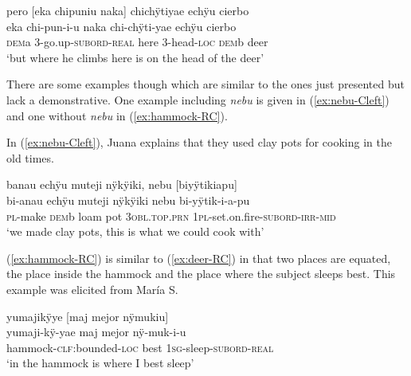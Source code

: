 \ea\label{ex:deer-RC}
\begingl
\glpreamble pero \textup{[}eka chipuniu naka\textup{]} chichÿtiyae echÿu cierbo\\
\gla eka chi-pun-i-u naka chi-chÿti-yae echÿu cierbo\\
\glb \textsc{dem}a 3-go.up-\textsc{subord}-\textsc{real} here 3-head-\textsc{loc} \textsc{dem}b deer\\
\glft ‘but where he climbs here is on the head of the deer’
\endgl
\trailingcitation{[mox-a110920l-2 124]}
\xe

There are some examples though which are similar to the ones just presented but lack a demonstrative. One example including \textit{nebu} is given in (\ref{ex:nebu-Cleft}) and one without \textit{nebu} in (\ref{ex:hammock-RC}).

In (\ref{ex:nebu-Cleft}), Juana explains that they used clay pots for cooking in the old times.

\ea\label{ex:nebu-Cleft}
\begingl
\glpreamble banau echÿu muteji nÿkÿiki, nebu \textup{[}biyÿtikiapu\textup{]}\\
\gla bi-anau echÿu muteji nÿkÿiki nebu bi-yÿtik-i-a-pu\\
\textsc{pl}-make \textsc{dem}b loam pot 3\textsc{obl.top.prn} 1\textsc{pl}-set.on.fire-\textsc{subord}-\textsc{irr}-\textsc{mid}\\
\glft ‘we made clay pots, this is what we could cook with’
\endgl
\trailingcitation{[jxx-d110923l-2.20]}
\xe

(\ref{ex:hammock-RC}) is similar to (\ref{ex:deer-RC}) in that two places are equated, the place inside the hammock and the place where the subject sleeps best. This example was elicited from María S.

\ea\label{ex:hammock-RC}
\begingl
\glpreamble yumajikÿye \textup{[}maj mejor nÿmukiu\textup{]}\\
\gla yumaji-kÿ-yae {maj mejor} nÿ-muk-i-u\\
\glb hammock-\textsc{clf:}bounded-\textsc{loc} {best} 1\textsc{sg}-sleep-\textsc{subord}-\textsc{real}\\
\glft ‘in the hammock is where I best sleep’
\endgl
\trailingcitation{[rmx-e150922l.118]}
\xe


